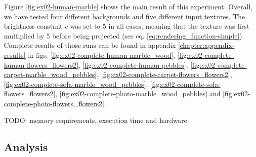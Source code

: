 Figure \ref{fig:ex02-human-marble} shows the main result of this experiment. Overall, we have tested four different backgrounds and five different input textures. The brightness constant \(c\) was set to \(5\) in all cases, meaning that the texture was first multiplied by \(5\) before being projected (see eq. \ref{eq:rendering_function-simple}). Complete results of those runs can be found in appendix \ref{chapter:appendix-results} in figs. \ref{fig:ex02-complete-human-marble_wood}, \ref{fig:ex02-complete-human-flowers_flowers2}, \ref{fig:ex02-complete-human-pebbles}, \ref{fig:ex02-complete-carpet-marble_wood_pebbles}, \ref{fig:ex02-complete-carpet-flowers_flowers2}, \ref{fig:ex02-complete-sofa-marble_wood_pebbles}, \ref{fig:ex02-complete-sofa-flowers_flowers2}, \ref{fig:ex02-complete-photo-marble_wood_pebbles} and \ref{fig:ex02-complete-photo-flowers_flowers2}.

{\color{red} TODO: memory requirements, execution time and hardware}

\subsection{Analysis}
\label{section:results-experiments-02-analysis}

